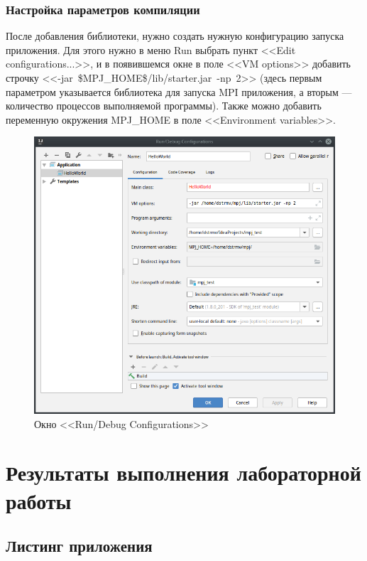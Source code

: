 \documentclass[titlepage,oneside,final,14pt]{extarticle} %
\begin{document}
\subsubsection{Настройка параметров компиляции}

После добавления библиотеки, нужно создать нужную конфигурацию запуска приложения. Для этого нужно в меню Run выбрать пункт <<Edit configurations...>>, и в появившемся окне в поле <<VM options>> добавить строчку <<\ttfamily-jar~\$MPJ\_HOME\$/lib/starter.jar~-np~2\normalfont>> (здесь первым параметром указывается библиотека для запуска MPI приложения, а вторым --- количество процессов выполняемой программы). Также можно добавить переменную окружения MPJ\_HOME в поле <<Environment variables>>.

\begin{figure}[H]
	\includegraphics[width=0.9\linewidth]{edit_configurations.png}
	\centering
	\caption{Окно <<Run/Debug Configurations>>}
\end{figure}

\section{Результаты выполнения лабораторной работы}

\subsection{Листинг приложения}
\end{document}
